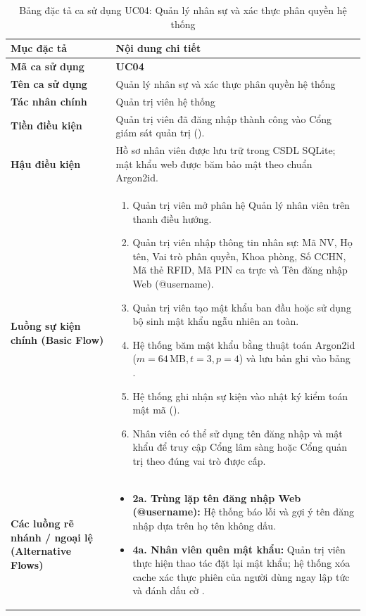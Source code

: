 \begin{table}[htbp]
\centering
\small
\begin{tabularx}{\textwidth}{L{3.2cm} Y}
\toprule
\textbf{Mục đặc tả} & \textbf{Nội dung chi tiết} \\
\midrule
\textbf{Mã ca sử dụng} & \textbf{UC04} \\
\textbf{Tên ca sử dụng} & Quản lý nhân sự và xác thực phân quyền hệ thống \\
\textbf{Tác nhân chính} & Quản trị viên hệ thống \\
\textbf{Tiền điều kiện} & Quản trị viên đã đăng nhập thành công vào Cổng giám sát quản trị (). \\
\textbf{Hậu điều kiện} & Hồ sơ nhân viên được lưu trữ trong CSDL SQLite; mật khẩu web được băm bảo mật theo chuẩn Argon2id. \\
\midrule
\textbf{Luồng sự kiện chính (Basic Flow)} & 
\begin{enumerate}[leftmargin=1.2em, topsep=0pt, partopsep=0pt]
    \item Quản trị viên mở phân hệ Quản lý nhân viên trên thanh điều hướng.
    \item Quản trị viên nhập thông tin nhân sự: Mã NV, Họ tên, Vai trò phân quyền, Khoa phòng, Số CCHN, Mã thẻ RFID, Mã PIN ca trực và Tên đăng nhập Web (@username).
    \item Quản trị viên tạo mật khẩu ban đầu hoặc sử dụng bộ sinh mật khẩu ngẫu nhiên an toàn.
    \item Hệ thống băm mật khẩu bằng thuật toán Argon2id ($m = 64\,\text{MB}, t = 3, p = 4$) và lưu bản ghi vào bảng .
    \item Hệ thống ghi nhận sự kiện vào nhật ký kiểm toán mật mã ().
    \item Nhân viên có thể sử dụng tên đăng nhập và mật khẩu để truy cập Cổng lâm sàng hoặc Cổng quản trị theo đúng vai trò được cấp.
\end{enumerate} \\
\midrule
\textbf{Các luồng rẽ nhánh / ngoại lệ (Alternative Flows)} & 
\begin{itemize}[leftmargin=1.2em, topsep=0pt, partopsep=0pt]
    \item \textbf{2a. Trùng lặp tên đăng nhập Web (@username):} Hệ thống báo lỗi và gợi ý tên đăng nhập dựa trên họ tên không dấu.
    \item \textbf{4a. Nhân viên quên mật khẩu:} Quản trị viên thực hiện thao tác đặt lại mật khẩu; hệ thống xóa cache xác thực phiên của người dùng ngay lập tức và đánh dấu cờ .
\end{itemize} \\
\bottomrule
\end{tabularx}
\caption{Bảng đặc tả ca sử dụng UC04: Quản lý nhân sự và xác thực phân quyền hệ thống}
\label{tab:uc04_spec}
\end{table}


